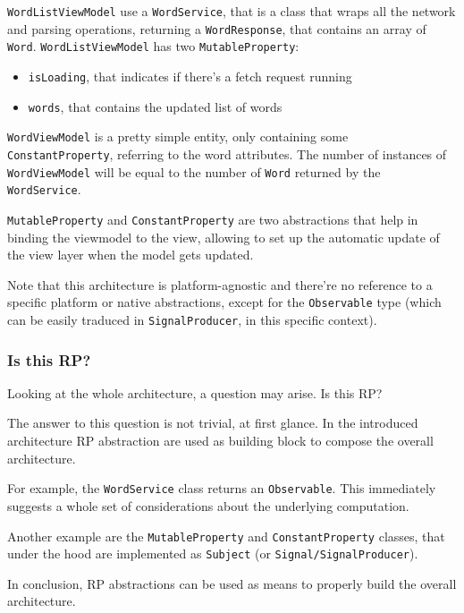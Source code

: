 \texttt{WordListViewModel} use a \texttt{WordService}, that is a class
that wraps all the network and parsing operations, returning a
\texttt{WordResponse}, that contains an array of \texttt{Word}.
\texttt{WordListViewModel} has two \texttt{MutableProperty}:

\begin{itemize}
\itemsep1pt\parskip0pt
\item
  \texttt{isLoading}, that indicates if there's a fetch request running
\item
  \texttt{words}, that contains the updated list of words
\end{itemize}

\texttt{WordViewModel} is a pretty simple entity, only containing some
\texttt{ConstantProperty}, referring to the word attributes. The number
of instances of \texttt{WordViewModel} will be equal to the number of
\texttt{Word} returned by the \texttt{WordService}.

\texttt{MutableProperty} and \texttt{ConstantProperty} are two
abstractions that help in binding the viewmodel to the view, allowing to
set up the automatic update of the view layer when the model gets
updated.

Note that this architecture is platform-agnostic and there're no
reference to a specific platform or native abstractions, except for the
\texttt{Observable} type (which can be easily traduced in
\texttt{SignalProducer}, in this specific context).

\subsubsection{Is this RP?}\label{is-this-rp}

Looking at the whole architecture, a question may arise. Is this RP?

The answer to this question is not trivial, at first glance. In the
introduced architecture RP abstraction are used as building block to
compose the overall architecture.

For example, the \texttt{WordService} class returns an
\texttt{Observable}. This immediately suggests a whole set of
considerations about the underlying computation.

Another example are the \texttt{MutableProperty} and
\texttt{ConstantProperty} classes, that under the hood are implemented
as \texttt{Subject} (or \texttt{Signal/SignalProducer}).

In conclusion, RP abstractions can be used as means to properly build
the overall architecture.


